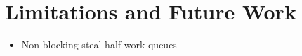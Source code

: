 \section{Limitations and Future Work}
\label{sec:queues-conclusion-future-work}


\begin{itemize}
\item Non-blocking steal-half work queues \cite{Hendler2002}
\end{itemize}


